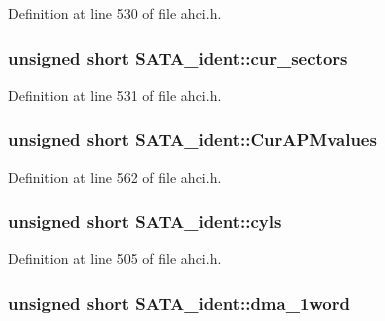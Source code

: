 Definition at line 530 of file ahci.\+h.

\subsubsection[{\texorpdfstring{cur\+\_\+sectors}{cur_sectors}}]{\setlength{\rightskip}{0pt plus 5cm}unsigned short S\+A\+T\+A\+\_\+ident\+::cur\+\_\+sectors}\hypertarget{structSATA__ident_add99ae85cb8e599a0344fbc72787c707}{}\label{structSATA__ident_add99ae85cb8e599a0344fbc72787c707}


Definition at line 531 of file ahci.\+h.

\subsubsection[{\texorpdfstring{Cur\+A\+P\+Mvalues}{CurAPMvalues}}]{\setlength{\rightskip}{0pt plus 5cm}unsigned short S\+A\+T\+A\+\_\+ident\+::\+Cur\+A\+P\+Mvalues}\hypertarget{structSATA__ident_a54577593de0dd4e949ad36a746325af0}{}\label{structSATA__ident_a54577593de0dd4e949ad36a746325af0}


Definition at line 562 of file ahci.\+h.

\subsubsection[{\texorpdfstring{cyls}{cyls}}]{\setlength{\rightskip}{0pt plus 5cm}unsigned short S\+A\+T\+A\+\_\+ident\+::cyls}\hypertarget{structSATA__ident_a4ecef9e7e7c21adcd2cdbbb6947074f7}{}\label{structSATA__ident_a4ecef9e7e7c21adcd2cdbbb6947074f7}


Definition at line 505 of file ahci.\+h.

\subsubsection[{\texorpdfstring{dma\+\_\+1word}{dma_1word}}]{\setlength{\rightskip}{0pt plus 5cm}unsigned short S\+A\+T\+A\+\_\+ident\+::dma\+\_\+1word}\hypertarget{structSATA__ident_a5a7cbcc17497c2cb6bfc6a79c7bca798}{}\label{structSATA__ident_a5a7cbcc17497c2cb6bfc6a79c7bca798}



